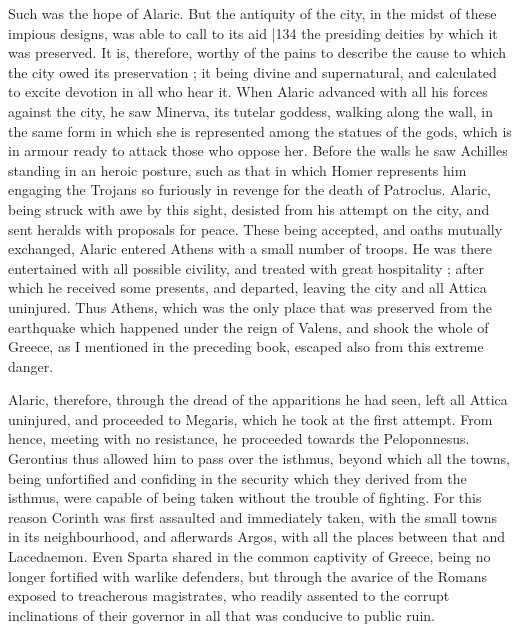 Such was the hope of Alaric. But the antiquity of the city, in the midst of these impious designs, was able to call to its aid
|134 the presiding deities by which it was preserved. It is, therefore, worthy of the pains to describe the cause to which the city owed its preservation ; it being divine and supernatural, and calculated to excite devotion in all who hear it. When Alaric advanced with all his forces against the city, he saw Minerva, its tutelar goddess, walking along the wall, in the same form in which she is represented among the statues of the gods, which is in armour ready to attack those who oppose her. Before the walls he saw Achilles standing in an heroic posture, such as that in which Homer represents him engaging the Trojans so furiously in revenge for the death of Patroclus. Alaric, being struck with awe by this sight, desisted from his attempt on the city, and sent heralds with proposals for peace. These being accepted, and oaths mutually exchanged, Alaric entered Athens with a small number of troops. He was there entertained with all possible civility, and treated with great hospitality ; after
which he received some presents, and departed, leaving the city and all Attica uninjured. Thus Athens, which was the only place that was preserved from the earthquake which happened under the reign of Valens, and shook the whole of Greece, as I mentioned in the preceding book, escaped also from this extreme danger.

Alaric, therefore, through the dread of the apparitions he had seen, left all Attica uninjured, and proceeded to Megaris, which he took at the first attempt. From hence, meeting with no resistance, he proceeded towards the Peloponnesus. Gerontius thus allowed him to pass over the isthmus, beyond which all the towns, being unfortified and confiding in the security which they derived from the isthmus, were capable of being taken without the trouble of fighting. For this reason Corinth was first assaulted and immediately taken, with the small towns in its neighbourhood, and aflerwards Argos, with all the places between that and Lacedaemon. Even Sparta shared in the common captivity of Greece, being no longer fortified with warlike defenders, but through the avarice of the Romans exposed to treacherous magistrates, who readily assented to the corrupt inclinations of their governor in all that was conducive to public ruin.

